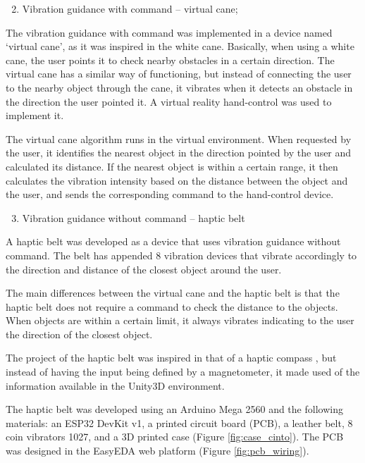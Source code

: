         \begin{enumerate} [label = \Alph*)]
            \setcounter{enumi}{1}
            \item Vibration guidance with command – virtual cane;
        \end{enumerate}

        The vibration guidance with command was implemented in a device named ‘virtual cane’, as it was inspired in the white cane. Basically, when using a white cane, the user points it to check nearby obstacles in a certain direction. The virtual cane has a similar way of functioning, but instead of connecting the user to the nearby object through the cane, it vibrates when it detects an obstacle in the direction the user pointed it. A virtual reality hand-control was used to implement it. 

        The virtual cane algorithm runs in the virtual environment. When requested by the user, it identifies the nearest object in the direction pointed by the user and calculated its distance. If the nearest object is within a certain range, it then calculates the vibration intensity based on the distance between the object and the user, and sends the corresponding command to the hand-control device.

        \begin{enumerate} [label = \Alph*)]
            \setcounter{enumi}{2}
            \item Vibration guidance without command – haptic belt
        \end{enumerate}

        A haptic belt was developed as a device that uses vibration guidance without command. The belt has appended 8 vibration devices that vibrate accordingly to the direction and distance of the closest object around the user. 

        The main differences between the virtual cane and the haptic belt is that the haptic belt does not require a command to check the distance to the objects. When objects are within a certain limit, it always vibrates indicating to the user the direction of the closest object. 

        The project of the haptic belt was inspired in that of a haptic compass \cite{kylecorry31_instructables_2020}, but instead of having the input being defined by a magnetometer, it made used of the information available in the Unity3D environment.

        The haptic belt was developed using an Arduino Mega 2560 and the following materials: an ESP32 DevKit v1, a printed circuit board (PCB), a leather belt, 8 coin vibrators 1027, and a 3D printed case (Figure \ref{fig:case_cinto}). The PCB was designed in the EasyEDA web platform (Figure \ref{fig:pcb_wiring}). 

